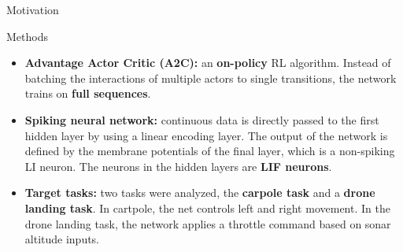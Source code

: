\documentclass[final,35pt]{beamer}
\newlength{\colwidth}
\begin{document}
\begin{frame}
\begin{columns}[t]
\begin{column}{\colwidth}
\begin{block}{{\fontsize{48}{24}\selectfont Motivation}}
{}
\end{block}
\vspace{1.5cm}

\begin{block}{{\fontsize{48}{40}\selectfont Methods}}

{
\begin{itemize}
    \item \textbf{Advantage Actor Critic (A2C):} an \textbf{on-policy} RL algorithm. Instead of batching the interactions of multiple actors to single transitions, the network trains on \textbf{full sequences}. 

    \vspace{1cm}
    \item \textbf{Spiking neural network:} continuous data is directly passed to the first hidden layer by using a linear encoding layer. The output of the network is defined by the membrane potentials of the final layer, which is a non-spiking LI neuron. The neurons in the hidden layers are \textbf{LIF neurons}.

    \vspace{1cm}
    \item \textbf{Target tasks:} two tasks were analyzed, the \textbf{carpole task} and a \textbf{drone landing task}. In cartpole, the net controls left and right movement. In the drone landing task, the network applies a throttle command based on sonar altitude inputs. 
\end{itemize}
}
\vspace{0.25cm}



\end{block}
\end{column}
\end{columns}
\end{frame}
\end{document}
